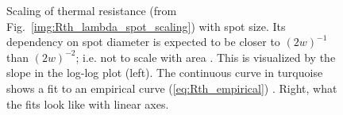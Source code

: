 \begin{figure}
\centering
{}
\caption{Scaling of thermal resistance
(from Fig.~\ref{img:Rth_lambda_spot_scaling})
with spot size.
Its dependency on spot diameter is expected to be closer to
$(2w)^{-1}$ than $(2w)^{-2}$;
i.e. not to scale with area \cite{Giet2008}.
This is visualized by the slope in the log-log plot (left).
The continuous curve in turquoise shows a fit to
an empirical curve (\ref{eq:Rth_empirical}) \cite{Giet2008,Nakwaski1992}.
Right,
what the fits look like with linear axes.}
\label{img:Rth_spotsizescaling}
\end{figure}

